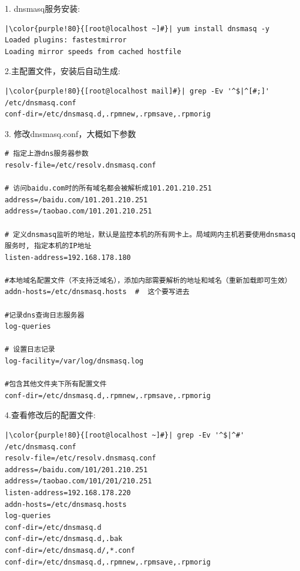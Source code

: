\begin{ascboxB}{1.  dnsmasq服务安装:}
\begin{verbatim}
|\color{purple!80}{[root@localhost ~]#}| yum install dnsmasq -y
Loaded plugins: fastestmirror
Loading mirror speeds from cached hostfile
\end{verbatim}
\end{ascboxB}
	\begin{ascboxB}{2.主配置文件，安装后自动生成:}
\begin{verbatim}
|\color{purple!80}{[root@localhost mail]#}| grep -Ev '^$|^[#;]' /etc/dnsmasq.conf
conf-dir=/etc/dnsmasq.d,.rpmnew,.rpmsave,.rpmorig
\end{verbatim}
\end{ascboxB}
	\begin{ascboxB}{3. 修改dnsmasq.conf，大概如下参数}
\begin{verbatim}
# 指定上游dns服务器参数
resolv-file=/etc/resolv.dnsmasq.conf

# 访问baidu.com时的所有域名都会被解析成101.201.210.251
address=/baidu.com/101.201.210.251
address=/taobao.com/101.201.210.251

# 定义dnsmasq监听的地址，默认是监控本机的所有网卡上。局域网内主机若要使用dnsmasq服务时, 指定本机的IP地址
listen-address=192.168.178.180

#本地域名配置文件（不支持泛域名），添加内部需要解析的地址和域名（重新加载即可生效）
addn-hosts=/etc/dnsmasq.hosts  #  这个要写进去

#记录dns查询日志服务器
log-queries

# 设置日志记录
log-facility=/var/log/dnsmasq.log

#包含其他文件夹下所有配置文件
conf-dir=/etc/dnsmasq.d,.rpmnew,.rpmsave,.rpmorig
\end{verbatim}
	\end{ascboxB}
	\begin{ascboxB}{4.查看修改后的配置文件:}
\begin{verbatim}
|\color{purple!80}{[root@localhost ~]#}| grep -Ev '^$|^#' /etc/dnsmasq.conf
resolv-file=/etc/resolv.dnsmasq.conf
address=/baidu.com/101/201.210.251
address=/taobao.com/101/201/210.251
listen-address=192.168.178.220
addn-hosts=/etc/dnsmasq.hosts
log-queries
conf-dir=/etc/dnsmasq.d
conf-dir=/etc/dnsmasq.d,.bak
conf-dir=/etc/dnsmasq.d/,*.conf
conf-dir=/etc/dnsmasq.d,.rpmnew,.rpmsave,.rpmorig
\end{verbatim}
\end{ascboxB}
\btrule{}

